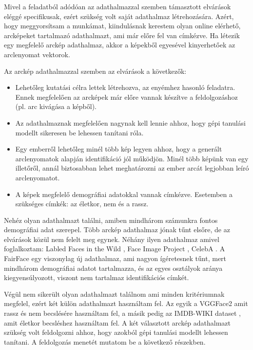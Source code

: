 Mivel a feladatból adódóan az adathalmazzal szemben támasztott elvárások eléggé specifikusak, ezért szükség volt saját adathalmaz létrehozására. Azért, hogy meggyorsítsam a munkámat, kiindulásnak kerestem olyan online elérhető, arcképeket tartalmazó adathalmazt, ami már előre fel van címkézve. Ha létezik egy megfelelő arckép adathalmaz, akkor a képekből egyesével kinyerhetőek az arclenyomat vektorok. 

Az arckép adathalmazzal szemben az elvárások a következők:
\begin{itemize}
	\item Lehetőleg kutatási célra lettek létrehozva, az enyémhez hasonló feladatra. Ennek megfelelően az arcképek már előre vannak készítve a feldolgozáshoz (pl. arc kivágása a képből).
	\item Az adathalmaznak megfelelően nagynak kell lennie ahhoz, hogy gépi tanulási modellt sikeresen be lehessen tanítani róla.
	\item Egy emberről lehetőleg minél több kép legyen ahhoz, hogy a generált arclenyomatok alapján identifikáció jól működjön. Minél több képünk van egy illetőről, annál biztosabban lehet meghatározni az ember arcát legjobban leíró arclenyomatot.
	\item A képek megfelelő demográfiai adatokkal vannak címkézve. Esetemben a szükséges címkék: az életkor, nem és a rassz.
\end{itemize}

Nehéz olyan adathalmazt találni, amiben mindhárom számunkra fontos demográfiai adat szerepel. Több arckép adathalmaz jónak tűnt elsőre, de az elvárások közül nem felelt meg egynek. Néhány ilyen adathalmaz amivel foglalkoztam: Labled Faces in the Wild \cite{labledfacesinthewild2008}, Face Image Project \cite{faceimageproject2014}, CelebA \cite{celebA2015}. A FairFace \cite{fairface2021} egy viszonylag új adathalmaz, ami nagyon ígéretesnek tűnt, mert mindhárom demográfiai adatot tartalmazza, és az egyes osztályok aránya kiegyensúlyozott, viszont nem tartalmaz identifikációs címkét.

Végül nem sikerült olyan adathalmazt találnom ami minden kritériumnak megfelel, ezért két külön adathalmazt használtam fel. Az egyik a VGGFace2 \cite{vggface22018} amit rassz és nem becslésére használtam fel, a másik pedig az IMDB-WIKI dataset \cite{imdbwiki2018}, amit életkor becsléshez használtam fel. A két választott arckép adathalmazt szükség volt feldolgozni ahhoz, hogy azokból gépi tanulási modellt lehessen tanítani. A feldolgozás menetét mutatom be a következő részekben.

